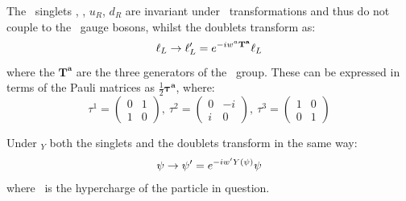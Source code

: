 The \sutwo\ singlets \eR, \nuR, $u_{R}$, $d_{R}$ are invariant under \sutwo\
transformations and thus do not couple to the \Wmu\ gauge bosons, whilst the
doublets transform as:
\begin{equation}
\ell_{L} \rightarrow \ell_{L}' = e^{-iw^{a}\mathbf{T^{a}}}\ell_{L}
\end{equation}
where the $\mathbf{T^{a}}$ are the three generators of the \sutwo\ group. These
can be expressed in terms of the Pauli matrices as $\frac{1}{2}
\mathbf{\tau^{a}}$, where:
\begin{equation}
\tau^{1} = \left( \begin{array}{cc} 0 & 1 \\ 1 & 0 \end{array} \right), \  
\tau^{2} = \left( \begin{array}{cc} 0 & -i \\ i & 0 \end{array} \right), \  
\tau^{3} = \left( \begin{array}{cc} 1 & 0 \\ 0 & 1 \end{array} \right)
\label{eqn:pauli-matrices}
\end{equation}

Under \uone$_{Y}$ both the singlets and the doublets transform in the same way:
\begin{align}
\psi \ra \psi' = e^{-i w' \hyperY(\psi)} \psi
\label{eqn:u1-transofrmation}
\end{align}
where \hyperY\ is the hypercharge of the particle in question.


